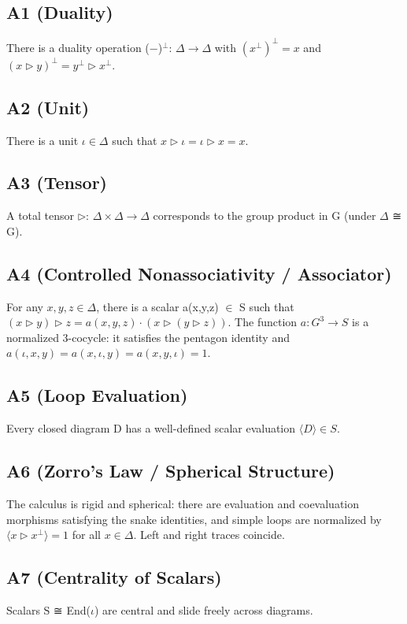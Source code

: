 \documentclass[11pt]{article}
\theoremstyle{definition}
\theoremstyle{remark}
\newcommand{\iotaunit}{\iota}
\newcommand{\tens}{\mathbin{\triangleright}}
\begin{document}
\subsection{A1 (Duality)}
There is a duality operation (−)$^{\perp}$: $\Delta \to \Delta$ with $(x^{\perp})^{\perp} = x$ and $(x \tens y)^{\perp} = y^{\perp} \tens x^{\perp}$.

\subsection{A2 (Unit)}
There is a unit $\iotaunit \in \Delta$ such that $x \tens \iotaunit = \iotaunit \tens x = x$.

\subsection{A3 (Tensor)}
A total tensor $\tens$: $\Delta \times \Delta \to \Delta$ corresponds to the group product in G (under $\Delta$ ≅ G).

\subsection{A4 (Controlled Nonassociativity / Associator)}
For any $x,y,z \in \Delta$, there is a scalar a(x,y,z) $\in$ S such that $(x \tens y) \tens z = a(x,y,z) \cdot (x \tens (y \tens z))$.
The function $a: G^3 \to S$ is a normalized 3-cocycle: it satisfies the pentagon identity and $a(\iotaunit,x,y)=a(x,\iotaunit,y)=a(x,y,\iotaunit)=1$.

\subsection{A5 (Loop Evaluation)}
Every closed diagram D has a well-defined scalar evaluation $\langle D \rangle \in S$.

\subsection{A6 (Zorro’s Law / Spherical Structure)}
The calculus is rigid and spherical: there are evaluation and coevaluation morphisms satisfying the snake identities, and simple loops are normalized by $\langle x \tens x^{\perp} \rangle = 1$ for all $x \in \Delta$. Left and right traces coincide.

\subsection{A7 (Centrality of Scalars)}
Scalars S ≅ End($\iotaunit$) are central and slide freely across diagrams.
\end{document}
